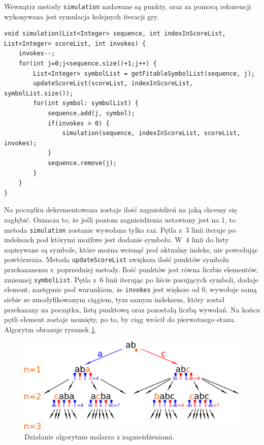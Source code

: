 \documentclass[document]{xmgr}
\begin{document}
Wewnątrz metody \texttt{simulation} nadawane są punkty, oraz za pomocą rekurencji wykonywana jest symulacja kolejnych iteracji gry.

\begin{lstlisting}[frame=single]
void simulation(List<Integer> sequence, int indexInScoreList, List<Integer> scoreList, int invokes) {
	invokes--;
	for(int j=0;j<sequence.size()+1;j++) {
		List<Integer> symbolList = getFitableSymbolList(sequence, j);
		updateScoreList(scoreList, indexInScoreList, symbolList.size());
		for(int symbol: symbolList) {
			sequence.add(j, symbol);
			if(invokes > 0) {
				simulation(sequence, indexInScoreList, scoreList, invokes);
			}
			sequence.remove(j);
		}
	}
}
\end{lstlisting}

Na początku dekrementowana zostaje ilość zagnieżdżeń na jaką chcemy się zagłębić. Oznacza to, że jeśli poziom zagnieżdżenia ustawiony jest na $1$, to metoda \texttt{simulation} zostanie wywołana tylko raz. Pętla z~3 linii iteruje po indeksach pod którymi możliwe jest dodanie symbolu. W~4 linii do listy zapisywane są symbole, które można wcisnąć pod aktualny indeks, nie powodując powtórzenia. Metoda \texttt{updateScoreList} zwiększa ilość punktów symbolu przekazanemu z~poprzedniej metody. Ilość punktów jest równa liczbie elementów, zmiennej \texttt{symbolList}. Pętla z~6 linii iterując po liście pasujących symboli, dodaje element, następnie pod warunkiem, że \mbox{\texttt{invokes}} jest większe od $0$, wywołuje samą siebie ze zmodyfikowanym ciągiem, tym samym indeksem, który został przekazany na początku, listą punktową oraz pozostałą liczbą wywołań. Na końcu pętli element zostaje usunięty, po to, by ciąg wrócił do pierwotnego stanu. Algorytm obrazuje rysunek \ref{fig:nestingPainter}.

\begin{figure}[tbh]
    \centering
    \includegraphics[width = \textwidth]{images/nestingPainter}
    \caption{Działanie algorytmu malarza z zagnieżdżeniami.}
    \label{fig:nestingPainter}
\end{figure}
\end{document}
